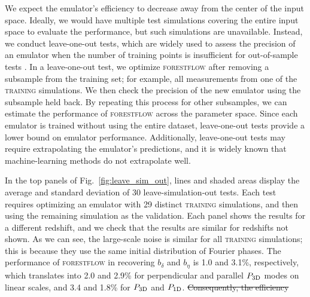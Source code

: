 \documentclass{aa}
\newcommand{\poned}{\ensuremath{P_{\rm 1D}}\xspace}
\newcommand{\pthreed}{\ensuremath{P_{\rm 3D}}\xspace}
\newcommand{\forestflow}{\textsc{forestflow}\xspace}
\newcommand{\lacehc}{\textsc{training}\xspace}
\providecommand{\DIFaddtex}[1]{{\protect\color{blue}\uwave{#1}}} %
\providecommand{\DIFdeltex}[1]{{\protect\color{red}\sout{#1}}}                      %
\providecommand{\DIFaddbegin}{} %
\providecommand{\DIFaddend}{} %
\providecommand{\DIFdelbegin}{} %
\providecommand{\DIFdelend}{} %
\providecommand{\DIFadd}[1]{\texorpdfstring{\DIFaddtex{#1}}{#1}} %
\providecommand{\DIFdel}[1]{\texorpdfstring{\DIFdeltex{#1}}{}} %
\newcommand{\DIFscaledelfig}{0.5}
\newlength{\DIFdelgraphicswidth} %
\newlength{\DIFdelgraphicsheight} %
\newcommand{\DIFaddincludegraphics}[2][]{{\color{blue}\fbox{\DIFOincludegraphics[#1]{#2}}}} %
\newcommand{\DIFdelincludegraphics}[2][]{%
\sbox{\DIFdelgraphicsbox}{\DIFOincludegraphics[#1]{#2}}%
\settoboxwidth{\DIFdelgraphicswidth}{\DIFdelgraphicsbox} %
\settoboxtotalheight{\DIFdelgraphicsheight}{\DIFdelgraphicsbox} %
\scalebox{\DIFscaledelfig}{%
\parbox[b]{\DIFdelgraphicswidth}{\usebox{\DIFdelgraphicsbox}\\[-\baselineskip] \rule{\DIFdelgraphicswidth}{0em}}\llap{\resizebox{\DIFdelgraphicswidth}{\DIFdelgraphicsheight}{%
\setlength{\unitlength}{\DIFdelgraphicswidth}%
\begin{picture}(1,1)%
\thicklines\linethickness{2pt} %
{\color[rgb]{1,0,0}\put(0,0){\framebox(1,1){}}}%
{\color[rgb]{1,0,0}\put(0,0){\line( 1,1){1}}}%
{\color[rgb]{1,0,0}\put(0,1){\line(1,-1){1}}}%
\end{picture}%
}\hspace*{3pt}}} %
} %
\DeclareRobustCommand{\DIFaddbegin}{\DIFOaddbegin \let\includegraphics\DIFaddincludegraphics} %
\DeclareRobustCommand{\DIFaddend}{\DIFOaddend \let\includegraphics\DIFOincludegraphics} %
\DeclareRobustCommand{\DIFdelbegin}{\DIFOdelbegin \let\includegraphics\DIFdelincludegraphics} %
\DeclareRobustCommand{\DIFdelend}{\DIFOaddend \let\includegraphics\DIFOincludegraphics} %
\begin{document}
We expect the emulator's efficiency to decrease away from the center of the input space. Ideally, we would have multiple test simulations covering the entire input space to evaluate the performance, but such simulations are unavailable. Instead, we conduct leave-one-out tests, which are widely used to assess the precision of an emulator when the number of training points is insufficient for out-of-sample tests \citep[e.g.;][]{hastie01statisticallearning}. In a leave-one-out test, we optimize \forestflow after removing a subsample from the training set; for example, all measurements from one of the \lacehc simulations. We then check the precision of the new emulator using the subsample held back. By repeating this process for other subsamples, we can estimate the performance of \forestflow across the parameter space. Since each emulator is trained without using the entire dataset, leave-one-out tests provide a lower bound on emulator performance. Additionally, leave-one-out tests may require extrapolating the emulator's predictions, and it is widely known that machine-learning methods do not extrapolate well.

In the top panels of Fig.~\ref{fig:leave_sim_out}, lines and shaded areas display the average and standard deviation of 30 leave-simulation-out tests. Each test requires optimizing an emulator with 29 distinct \lacehc simulations, and then using the remaining simulation as the validation. Each panel shows the results for a different redshift, and we check that the results are similar for redshifts not shown. As we can see, the large-scale noise is similar for all \lacehc simulations; this is because they use the same initial distribution of Fourier phases. The \DIFaddbegin \DIFadd{overall }\DIFaddend performance of \forestflow in recovering $b_\delta$ and $b_\eta$ is 1.0 and 3.1\%, respectively, which translates into 2.0 and 2.9\% for perpendicular and parallel \pthreed modes on linear scales, and 3.4 and 1.8\% for \pthreed and \poned.
\DIFdelbegin \DIFdel{Consequently, the efficiency }\DIFdelend \DIFaddbegin 
\end{document}
